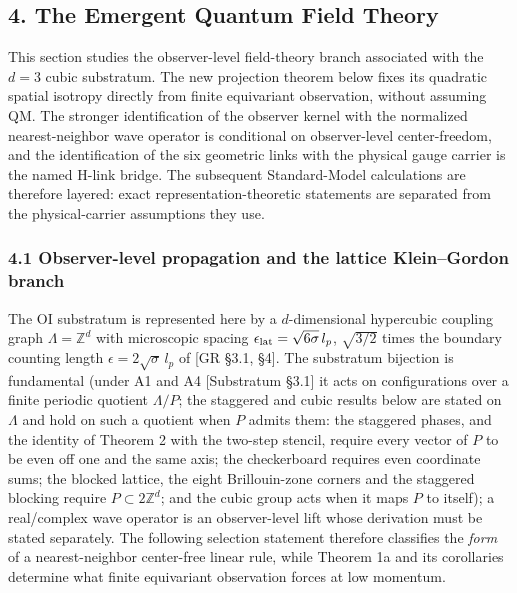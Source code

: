 \documentclass[
]{article}
\begin{document}
\hypertarget{the-emergent-quantum-field-theory}{%
\subsection{4. The Emergent Quantum Field
Theory}\label{the-emergent-quantum-field-theory}}

This section studies the observer-level field-theory branch associated
with the \(d=3\) cubic substratum. The new projection theorem below
fixes its quadratic spatial isotropy directly from finite equivariant
observation, without assuming QM. The stronger identification of the
observer kernel with the normalized nearest-neighbor wave operator is
conditional on observer-level center-freedom, and the identification of
the six geometric links with the physical gauge carrier is the named
H-link bridge. The subsequent Standard-Model calculations are therefore
layered: exact representation-theoretic statements are separated from
the physical-carrier assumptions they use.

\hypertarget{observer-level-propagation-and-the-lattice-kleingordon-branch}{%
\subsubsection{4.1 Observer-level propagation and the lattice
Klein--Gordon
branch}\label{observer-level-propagation-and-the-lattice-kleingordon-branch}}

The OI substratum is represented here by a \(d\)-dimensional hypercubic
coupling graph \(\Lambda=\mathbb Z^d\) with microscopic spacing
\(\epsilon_{\rm lat}=\sqrt{6\sigma}\,l_p\), \(\sqrt{3/2}\) times the
boundary counting length \(\epsilon=2\sqrt{\sigma}\,l_p\) of {[}GR §3.1,
§4{]}. The substratum bijection is fundamental (under A1 and A4
{[}Substratum §3.1{]} it acts on configurations over a finite periodic
quotient \(\Lambda/P\); the staggered and cubic results below are stated
on \(\Lambda\) and hold on such a quotient when \(P\) admits them: the
staggered phases, and the identity of Theorem 2 with the two-step
stencil, require every vector of \(P\) to be even off one and the same
axis; the checkerboard requires even coordinate sums; the blocked
lattice, the eight Brillouin-zone corners and the staggered blocking
require \(P \subset 2\mathbb Z^d\); and the cubic group acts when it
maps \(P\) to itself); a real/complex wave operator is an observer-level
lift whose derivation must be stated separately. The following selection
statement therefore classifies the \emph{form} of a nearest-neighbor
center-free linear rule, while Theorem 1a and its corollaries determine
what finite equivariant observation forces at low momentum.
\end{document}
